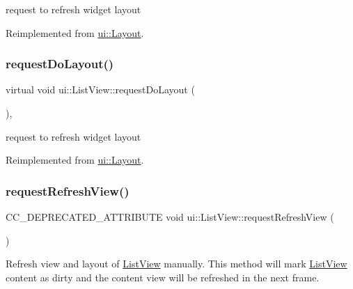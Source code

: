 request to refresh widget layout 

Reimplemented from \hyperlink{classui_1_1Layout_a972bfe6c80741c99becff44a3f991558}{ui\+::\+Layout}.

\mbox{\label{classui_1_1ListView_ab559aec6b481480fad169f2a53094028}} 
\subsubsection{\texorpdfstring{request\+Do\+Layout()}{requestDoLayout()}\hspace{0.1cm}{\footnotesize\ttfamily [2/2]}}
{\footnotesize\ttfamily virtual void ui\+::\+List\+View\+::request\+Do\+Layout (\begin{DoxyParamCaption}{ }\end{DoxyParamCaption})\hspace{0.3cm}{\ttfamily [override]}, {\ttfamily [virtual]}}

request to refresh widget layout 

Reimplemented from \hyperlink{classui_1_1Layout_a972bfe6c80741c99becff44a3f991558}{ui\+::\+Layout}.

\mbox{\label{classui_1_1ListView_a4c022c87acd7ba5ddaaae7a3f0dac170}} 
\subsubsection{\texorpdfstring{request\+Refresh\+View()}{requestRefreshView()}\hspace{0.1cm}{\footnotesize\ttfamily [1/2]}}
{\footnotesize\ttfamily C\+C\+\_\+\+D\+E\+P\+R\+E\+C\+A\+T\+E\+D\+\_\+\+A\+T\+T\+R\+I\+B\+U\+TE void ui\+::\+List\+View\+::request\+Refresh\+View (\begin{DoxyParamCaption}{ }\end{DoxyParamCaption})}



Refresh view and layout of \hyperlink{classui_1_1ListView}{List\+View} manually. This method will mark \hyperlink{classui_1_1ListView}{List\+View} content as dirty and the content view will be refreshed in the next frame. 

